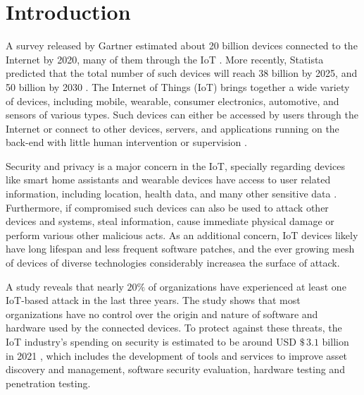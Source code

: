 

\section{Introduction}

\newcommand{\refminas}{\textit{Ref}\xspace}
\newcommand{\mfog}{\textit{MFOG}\xspace}
\newcommand{\iot}{IoT\xspace}
\newcommand{\nids}{NIDS\xspace}
\newcommand{\ds}{DS\xspace}


A survey released by Gartner estimated about 20 billion devices connected to the
Internet by 2020, many of them through the IoT \cite{gartner_forecast_2017}.
More recently, Statista predicted that the total number of such devices will
reach 38 billion by 2025, and 50 billion by 2030 \cite{statista-iot}.
The Internet of Things (IoT) brings together a wide variety of devices,
including mobile, wearable, consumer electronics, automotive, and sensors of
various types.
Such devices can either be accessed by users through the Internet or %
connect
to other devices, servers, and applications running on the back-end
with little human intervention or supervision
\cite{Tahsien2020,abane2019,haddadpajouh2019survey,Shanbhag2015}.

Security and privacy is a major concern in the IoT, specially regarding %
devices like smart home assistants and wearable devices %
have access to user related information, including
location, health data, and many other sensitive data
\cite{sengupta2020comprehensive}.
Furthermore, if compromised such devices can also be used to attack other
devices and systems, steal information, cause immediate physical damage or
perform various other malicious acts.
As an additional concern, IoT devices likely have long lifespan and less frequent
software patches, and the ever growing %
mesh of devices of diverse
technologies considerably increasea the surface of attack.

A study reveals that nearly $20\%$ of organizations have experienced at least one
IoT-based attack in the last three years.
The study shows that most organizations have no control over the origin and
nature of software and hardware used by the connected devices.
To protect against these threats, the IoT industry's spending on security is
estimated to be around USD $\$\,3.1$ billion in 2021 \cite{gartner_it_glossary_2018}, 
which includes the development of tools
and services to improve asset discovery and management, software security
evaluation, hardware testing and penetration testing.


